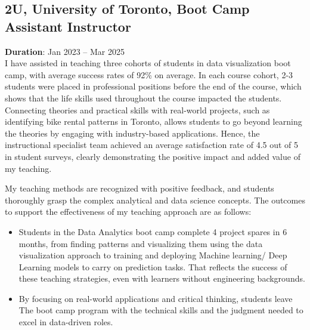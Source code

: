 \documentclass[10pt, letterpaper]{article}
\begin{document}
\subsection*{2U, University of Toronto,  Boot Camp Assistant Instructor}

\textbf{Duration}: Jan 2023 – Mar 2025 \\
I have assisted in teaching three cohorts of students in data visualization boot camp, with average success rates of 92\% on average. In each course cohort, 2-3 students were placed in professional positions before the end of the course, which shows that the life skills used throughout the course impacted the students. Connecting theories and practical skills with real-world projects, such as identifying bike rental patterns in Toronto, allows students to go beyond learning the theories by engaging with industry-based applications. Hence, the instructional specialist team achieved an average satisfaction rate of 4.5 out of 5 in student surveys, clearly demonstrating the positive impact and added value of my teaching.


My teaching methods are recognized with positive feedback, and students thoroughly grasp the complex analytical and data science concepts. The outcomes to support the effectiveness of my teaching approach are as follows:
\begin{itemize}
    \item   Students in the Data Analytics boot camp complete 4 project spares in 6 months, from finding patterns and visualizing them using the data visualization approach to training and deploying Machine learning/ Deep Learning models to carry on prediction tasks. That reflects the success of these teaching strategies, even with learners without engineering backgrounds.
    \item By focusing on real-world applications and critical thinking, students leave The boot camp program with the technical skills and the judgment needed to excel in data-driven roles.

\end{itemize}




\vspace{-0.3cm}
\end{document}

